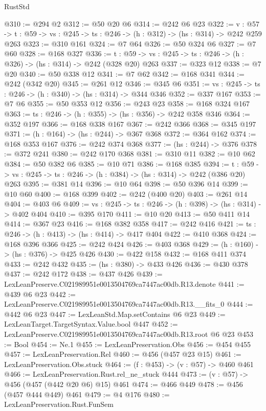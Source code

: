 \begin{lexlean}{RustStd}
\begin{coremodule}
@310 := @294 @2
@312 := @50 @20 @6
@314 := @242 @6 @23
@322 := {v : @57} ->
  {t : @59} -> {vs : @245} -> {ts : @246} -> (h : @312) -> (hs : @314) -> @242 @259 @263
@323 := @310 @161
@324 := @7 @64
@326 := @50 @324 @6
@327 := @7 @60
@328 := @168 @327
@336 := {t : @59} -> {vs : @245} -> {ts : @246} -> (h : @326) -> (hs : @314) -> @242 (@328 @20) @263
@337 := @323 @12
@338 := @7 @20
@340 := @50 @338 @12
@341 := @7 @62
@342 := @168 @341
@344 := @242 (@342 @20)
@345 := @261 @12
@346 := @345 @6
@351 := {vs : @245} -> {ts : @246} -> (h : @340) -> (hs : @314) -> @344 @346
@352 := @337 @167
@353 := @7 @6
@355 := @50 @353 @12
@356 := @243 @23
@358 := @168 @324 @167
@363 := {ts : @246} -> (h : @355) -> (hs : @356) -> @242 @358 @346
@364 := @352 @197
@366 := @168 @338 @167
@367 := @242 @366
@368 := @345 @197
@371 := (h : @164) -> (hs : @244) -> @367 @368
@372 := @364 @162
@374 := @168 @353 @167
@376 := @242 @374 @368
@377 := (hs : @244) -> @376
@378 := @372 @241
@380 := @242 @170 @368
@381 := @310 @11
@382 := @10 @62
@384 := @50 @382 @6
@385 := @10 @71
@386 := @168 @385
@394 := {t : @59} -> {vs : @245} -> {ts : @246} -> (h : @384) -> (hs : @314) -> @242 (@386 @20) @263
@395 := @381 @14
@396 := @10 @64
@398 := @50 @396 @14
@399 := @10 @60
@400 := @168 @399
@402 := @242 (@400 @20)
@403 := @261 @14
@404 := @403 @6
@409 := {vs : @245} -> {ts : @246} -> (h : @398) -> (hs : @314) -> @402 @404
@410 := @395 @170
@411 := @10 @20
@413 := @50 @411 @14
@414 := @367 @23
@416 := @168 @382 @358
@417 := @242 @416
@421 := {ts : @246} -> (h : @413) -> (hs : @414) -> @417 @404
@422 := @410 @368
@424 := @168 @396 @366
@425 := @242 @424
@426 := @403 @368
@429 := (h : @160) -> (hs : @376) -> @425 @426
@430 := @422 @158
@432 := @168 @411 @374
@433 := @242 @432
@435 := (hs : @380) -> @433 @426
@436 := @430 @378
@437 := @242 @172
@438 := @437 @426
@439 := LexLeanPreserve.C021989951e0013504769ca7447ac00db.R13.denote
@441 := @439 @6 @23
@442 := LexLeanPreserve.C021989951e0013504769ca7447ac00db.R13.__fits_0
@444 := @442 @6 @23
@447 := LexLeanStd.Map.setContains @6 @23
@449 := LexLeanTarget.TargetSyntax.Value.bool @447
@452 := LexLeanPreserve.C021989951e0013504769ca7447ac00db.R13.root @6 @23
@453 := Bool
@454 := Ne.{1}
@455 := LexLeanPreservation.Obs
@456 := @454 @455
@457 := LexLeanPreservation.Rel
@460 := @456 (@457 @23 @15)
@461 := LexLeanPreservation.Obs.stuck
@464 := (f : @453) -> (v : @57) -> @460 @461
@466 := LexLeanPreservation.Rust.rel_ne_stuck @444
@473 := (v : @57) -> @456 (@457 (@442 @20 @6) @15) @461
@474 := @466 @449
@478 := @456 (@457 @444 @449) @461
@479 := @4 @176
@480 := LexLeanPreservation.Rust.FunSem

\end{coremodule}
\end{lexlean}
